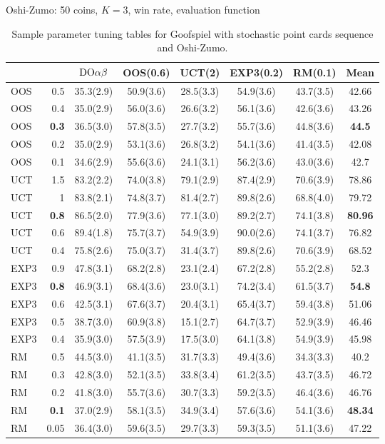 \begin{table}[t!]
\begin{scriptsize}
Oshi-Zumo: 50 coins, $K=3$, win rate, evaluation function
\begin{tabular}{|lr|ccccc|c|}\hline
&&$\textrm{DO}\alpha\beta$&OOS(0.6)&UCT(2)&EXP3(0.2)&RM(0.1)&Mean\\\hline
OOS&0.5&35.3(2.9)&50.9(3.6)&28.5(3.3)&54.9(3.6)&43.7(3.5)&42.66\\
OOS&0.4&35.0(2.9)&56.0(3.6)&26.6(3.2)&56.1(3.6)&42.6(3.6)&43.26\\
OOS&\textbf{0.3}&36.5(3.0)&57.8(3.5)&27.7(3.2)&55.7(3.6)&44.8(3.6)&\textbf{44.5}\\
OOS&0.2&35.0(2.9)&53.1(3.6)&26.8(3.2)&54.1(3.6)&41.4(3.5)&42.08\\
OOS&0.1&34.6(2.9)&55.6(3.6)&24.1(3.1)&56.2(3.6)&43.0(3.6)&42.7\\\hline
UCT&1.5&83.2(2.2)&74.0(3.8)&79.1(2.9)&87.4(2.9)&70.6(3.9)&78.86\\
UCT&1&83.8(2.1)&74.8(3.7)&81.4(2.7)&89.8(2.6)&68.8(4.0)&79.72\\
UCT&\textbf{0.8}&86.5(2.0)&77.9(3.6)&77.1(3.0)&89.2(2.7)&74.1(3.8)&\textbf{80.96}\\
UCT&0.6&89.4(1.8)&75.7(3.7)&54.9(3.9)&90.0(2.6)&74.1(3.7)&76.82\\
UCT&0.4&75.8(2.6)&75.0(3.7)&31.4(3.7)&89.8(2.6)&70.6(3.9)&68.52\\\hline
EXP3&0.9&47.8(3.1)&68.2(2.8)&23.1(2.4)&67.2(2.8)&55.2(2.8)&52.3\\
EXP3&\textbf{0.8}&46.9(3.1)&68.4(3.6)&23.0(3.1)&74.2(3.4)&61.5(3.7)&\textbf{54.8}\\
EXP3&0.6&42.5(3.1)&67.6(3.7)&20.4(3.1)&65.4(3.7)&59.4(3.8)&51.06\\
EXP3&0.5&38.7(3.0)&60.9(3.8)&15.1(2.7)&64.7(3.7)&52.9(3.9)&46.46\\
EXP3&0.4&35.9(3.0)&57.5(3.9)&17.5(3.0)&64.1(3.8)&54.9(3.9)&45.98\\\hline
RM&0.5&44.5(3.0)&41.1(3.5)&31.7(3.3)&49.4(3.6)&34.3(3.3)&40.2\\
RM&0.3&42.8(3.0)&52.1(3.5)&33.8(3.4)&61.2(3.5)&43.7(3.5)&46.72\\
RM&0.2&41.8(3.0)&55.7(3.6)&30.7(3.3)&59.2(3.5)&46.4(3.6)&46.76\\
RM&\textbf{0.1}&37.0(2.9)&58.1(3.5)&34.9(3.4)&57.6(3.6)&54.1(3.6)&\textbf{48.34}\\
RM&0.05&36.4(3.0)&59.6(3.5)&29.7(3.3)&59.3(3.5)&51.1(3.6)&47.22\\
\hline
\end{tabular}

\end{scriptsize}
\caption{Sample parameter tuning tables for Goofspiel with stochastic point cards sequence and Oshi-Zumo.}\label{fig:tuning}
\end{table}

